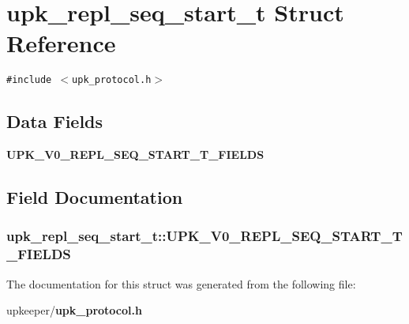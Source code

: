 \section{upk\_\-repl\_\-seq\_\-start\_\-t Struct Reference}
\label{structupk__repl__seq__start__t}
{\tt \#include $<$upk\_\-protocol.h$>$}

\subsection*{Data Fields}
\begin{CompactItemize}
\item 
\bf{UPK\_\-V0\_\-REPL\_\-SEQ\_\-START\_\-T\_\-FIELDS}
\end{CompactItemize}


\subsection{Field Documentation}
\subsubsection{\setlength{\rightskip}{0pt plus 5cm}\bf{upk\_\-repl\_\-seq\_\-start\_\-t::UPK\_\-V0\_\-REPL\_\-SEQ\_\-START\_\-T\_\-FIELDS}}\label{structupk__repl__seq__start__t_18a8dac052921eb188e3a76fce731555}




The documentation for this struct was generated from the following file:\begin{CompactItemize}
\item 
upkeeper/\bf{upk\_\-protocol.h}\end{CompactItemize}
